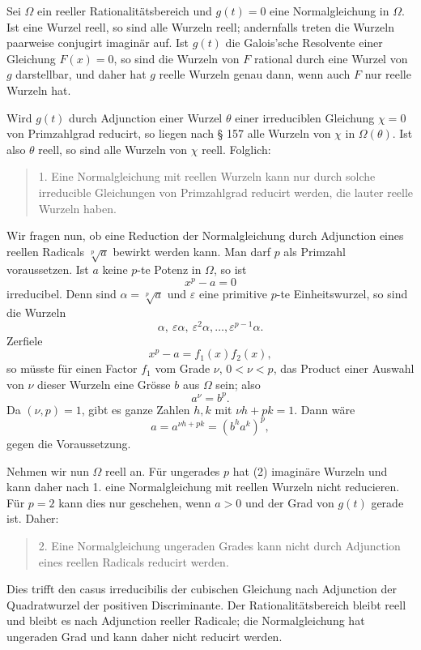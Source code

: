 \documentclass[11pt]{article}
\begin{document}
Sei $\Omega$ ein reeller Rationalitätsbereich und $g(t)=0$ eine Normalgleichung in $\Omega$. Ist eine Wurzel reell, so sind alle Wurzeln reell; andernfalls treten die Wurzeln paarweise conjugirt imaginär auf. Ist $g(t)$ die Galois'sche Resolvente einer Gleichung $F(x)=0$, so sind die Wurzeln von $F$ rational durch eine Wurzel von $g$ darstellbar, und daher hat $g$ reelle Wurzeln genau dann, wenn auch $F$ nur reelle Wurzeln hat.

Wird $g(t)$ durch Adjunction einer Wurzel $\theta$ einer irreduciblen Gleichung $\chi=0$ von Primzahlgrad reducirt, so liegen nach § 157 alle Wurzeln von $\chi$ in $\Omega(\theta)$. Ist also $\theta$ reell, so sind alle Wurzeln von $\chi$ reell. Folglich:
\begin{quote}
1. Eine Normalgleichung mit reellen Wurzeln kann nur durch solche irreducible Gleichungen von Primzahlgrad reducirt werden, die lauter reelle Wurzeln haben.
\end{quote}

Wir fragen nun, ob eine Reduction der Normalgleichung durch Adjunction eines reellen Radicals $\sqrt[p]{a}$ bewirkt werden kann. Man darf $p$ als Primzahl voraussetzen. Ist $a$ keine $p$-te Potenz in $\Omega$, so ist
\[
  x^p-a=0                                                        \tag{2}
\]
irreducibel. Denn sind $\alpha=\sqrt[p]{a}$ und $\varepsilon$ eine primitive $p$-te Einheitswurzel, so sind die Wurzeln
\[
  \alpha,\ \varepsilon\alpha,\ \varepsilon^2\alpha,\ldots,\varepsilon^{p-1}\alpha. \tag{1}
\]
Zerfiele
\[
  x^p-a=f_1(x)f_2(x),                                           \tag{3}
\]
so müsste für einen Factor $f_1$ vom Grade $\nu$, $0<\nu<p$, das Product einer Auswahl von $\nu$ dieser Wurzeln eine Grösse $b$ aus $\Omega$ sein; also
\[
  a^\nu=b^p.                                                    \tag{4}
\]
Da $(\nu,p)=1$, gibt es ganze Zahlen $h,k$ mit $\nu h+pk=1$. Dann wäre
\[
  a=a^{\nu h+pk}=(b^h a^k)^p,
\]
gegen die Voraussetzung.

Nehmen wir nun $\Omega$ reell an. Für ungerades $p$ hat (2) imaginäre Wurzeln und kann daher nach 1. eine Normalgleichung mit reellen Wurzeln nicht reducieren. Für $p=2$ kann dies nur geschehen, wenn $a>0$ und der Grad von $g(t)$ gerade ist. Daher:
\begin{quote}
2. Eine Normalgleichung ungeraden Grades kann nicht durch Adjunction eines reellen Radicals reducirt werden.
\end{quote}

Dies trifft den casus irreducibilis der cubischen Gleichung nach Adjunction der Quadratwurzel der positiven Discriminante. Der Rationalitätsbereich bleibt reell und bleibt es nach Adjunction reeller Radicale; die Normalgleichung hat ungeraden Grad und kann daher nicht reducirt werden.
\end{document}
